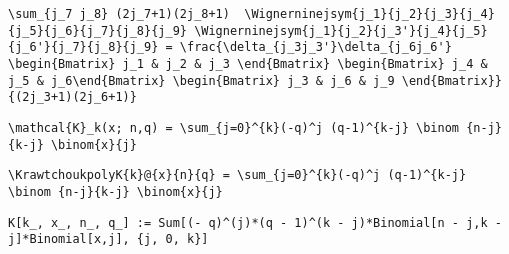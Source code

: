 \newsavebox\BYST
\begin{lrbox}{\BYST}
 \begin{minipage}[t]{0.82\textwidth}
  \lstinline[language={[latex]TeX},mathescape,breaklines=true]"\sum_{j_7 j_8} (2j_7+1)(2j_8+1)  \Wignerninejsym{j_1}{j_2}{j_3}{j_4}{j_5}{j_6}{j_7}{j_8}{j_9} \Wignerninejsym{j_1}{j_2}{j_3'}{j_4}{j_5}{j_6'}{j_7}{j_8}{j_9} = \frac{\delta_{j_3j_3'}\delta_{j_6j_6'} \begin{Bmatrix} j_1 & j_2 & j_3 \end{Bmatrix} \begin{Bmatrix} j_4 & j_5 & j_6\end{Bmatrix} \begin{Bmatrix} j_3 & j_6 & j_9 \end{Bmatrix}}{(2j_3+1)(2j_6+1)}"
 \end{minipage}
\end{lrbox}
\newsavebox\BYMM
\begin{lrbox}{\BYMM}
 \begin{minipage}[t]{0.82\textwidth}
  \lstinline[language={[latex]TeX},mathescape,breaklines=true]""
 \end{minipage}
\end{lrbox}
\newsavebox\BYMA
\begin{lrbox}{\BYMA}
 \begin{minipage}[t]{0.82\textwidth}
  \lstinline[language={[latex]TeX},mathescape,breaklines=true]""
 \end{minipage}
\end{lrbox}
\newsavebox\BZT
\begin{lrbox}{\BZT}
 \begin{minipage}[t]{0.82\textwidth}
  \lstinline[language={[latex]TeX},mathescape,breaklines=true]"\mathcal{K}_k(x; n,q) = \sum_{j=0}^{k}(-q)^j (q-1)^{k-j} \binom {n-j}{k-j} \binom{x}{j}"
 \end{minipage}
\end{lrbox}
\newsavebox\BZST
\begin{lrbox}{\BZST}
 \begin{minipage}[t]{0.82\textwidth}
  \lstinline[language={[latex]TeX},mathescape,breaklines=true]"\KrawtchoukpolyK{k}@{x}{n}{q} = \sum_{j=0}^{k}(-q)^j (q-1)^{k-j} \binom {n-j}{k-j} \binom{x}{j}"
 \end{minipage}
\end{lrbox}
\newsavebox\BZMM
\begin{lrbox}{\BZMM}
 \begin{minipage}[t]{0.82\textwidth}
  \lstinline[language={[latex]TeX},mathescape,breaklines=true]"K[k_, x_, n_, q_] := Sum[(- q)^(j)*(q - 1)^(k - j)*Binomial[n - j,k - j]*Binomial[x,j], {j, 0, k}]"
 \end{minipage}
\end{lrbox}
